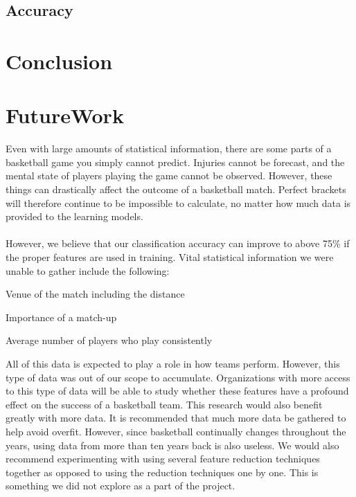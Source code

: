 \documentclass{article}
\begin{document}
\begin{multicols}{2}
	\subsection{Accuracy}
	
	\section{Conclusion}
	\section{FutureWork}	 
Even with large amounts of statistical information, there are some parts of a basketball game you simply cannot predict. Injuries cannot be forecast, and the mental state of players playing the game cannot be observed. However, these things can drastically affect the outcome of a basketball match. Perfect brackets will therefore continue to be impossible to calculate, no matter how much data is provided to the learning models.

\paragraph{}However, we believe that our classification accuracy can improve to above 75\% if the proper features are used in training. Vital statistical information we were unable to gather include the following:
\begin{list}{•}
\item
Venue of the match including the distance
\item
Importance of a match-up
\item
Average number of players who play consistently
\end{list}

All of this data is expected to play a role in how teams perform. However, this type of data was out of our scope to accumulate. Organizations with more access to this type of data will be able to study whether these features have a profound effect on the success of a basketball team. This research would also benefit greatly with more data. It is recommended that much more data be gathered to help avoid overfit. However, since basketball continually changes throughout the years, using data from more than ten years back is also useless. We would also recommend experimenting with using several feature reduction techniques together as opposed to using the reduction techniques one by one. This is something we did not explore as a part of the project.
	\end{multicols} 
\end{document}
